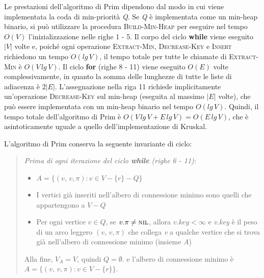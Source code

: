 \documentclass[10pt, a4paper]{report}
\begin{document}
Le prestazioni dell'algoritmo di Prim dipendono dal modo in cui viene implementata la coda di min-priorità \textit{Q}. Se \textit{Q} è implementata come un min-heap binario, si può utilizzare la procedura \textsc{Build-Min-Heap} per eseguire nel tempo $O(V)$ l'inizializzazione nelle righe 1 - 5. Il corpo del ciclo \textbf{while} viene eseguito $|V|$ volte e, poiché ogni operazione \textsc{Extract-Min}, \textsc{Decrease-Key} e \textsc{Insert} richiedono un tempo $O(lg\,V)$, il tempo totale per tutte le chiamate di \textsc{Extract-Min} è $O(V\,lg\,V)$. Il ciclo \textbf{for} (righe 8 - 11) viene eseguito $O(E)$ volte complessivamente, in quanto la somma delle lunghezze di tutte le liste di adiacenza è $2|E|$. L'assegnazione nella riga 11 richiede implicitamente un'operazione \textsc{Decrease-Key} sul min-heap (eseguita al massimo $|E|$ volte), che può essere implementata con un min-heap binario nel tempo $O(lg\,V)$. Quindi, il tempo totale dell'algoritmo di Prim è $O(V\,lg\,V + E\,lg\,V) = O(E\,lg\,V)$, che è asintoticamente uguale a quello dell'implementazione di Kruskal.

L'algoritmo di Prim conserva la seguente invariante di ciclo:
\begin{quote}
\textit{Prima di ogni iterazione del ciclo \textbf{while} (righe 6 - 11)}:
\begin{itemize}
\item$A = \{ (v,\,v,\pi) : v \in V - \{r\} - Q\}$
\item I vertici già inseriti nell'albero di connessione minimo sono quelli che appartengono a $V - Q$
\item Per ogni vertice $v \in Q$, se $v.\pi \neq \textsc{nil}$, allora $v.key < \infty$ e \textit{v.key} è il peso di un arco leggero $(v,\,v,\pi)$ che collega \textit{v} a qualche vertice che si trova già nell'albero di connessione minimo (insieme \textit{A})
\end{itemize}
Alla fine, $V_A = V$, quindi $Q = \emptyset$. e l'albero di connessione minimo è $A = \{ (v,\,v,\pi) : v \in V - \{r\} \}$.
\end{quote}
\end{document}
